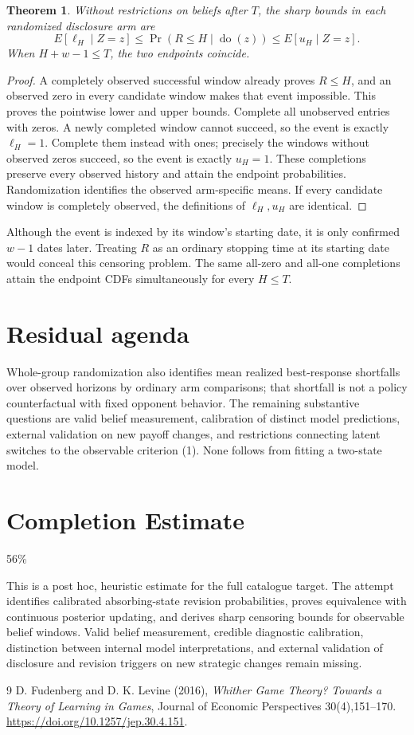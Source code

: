 \documentclass[11pt]{article}
\newtheorem{theorem}{Theorem}
\theoremstyle{definition}
\begin{document}
\begin{theorem}
Without restrictions on beliefs after $T$, the sharp bounds in each
randomized disclosure arm are
\[
 E[\ell_H\mid Z=z]\le
 \Pr(R\le H\mid\operatorname{do}(z))
 \le E[u_H\mid Z=z].                                   \tag{6}
\]
When $H+w-1\le T$, the two endpoints coincide.
\end{theorem}
\begin{proof}
A completely observed successful window already proves $R\le H$,
and an observed zero in every candidate window makes that event
impossible. This proves the pointwise lower and upper bounds. Complete
all unobserved entries with zeros. A newly completed window cannot
succeed, so the event is exactly $\ell_H=1$. Complete them instead
with ones; precisely the windows without observed zeros succeed, so
the event is exactly $u_H=1$. These completions preserve every observed
history and attain the endpoint probabilities. Randomization identifies
the observed arm-specific means. If every candidate window is completely
observed, the definitions of $\ell_H,u_H$ are identical.
\end{proof}
Although the event is indexed by its window's starting date, it is only
confirmed $w-1$ dates later. Treating $R$ as an ordinary stopping time
at its starting date would conceal this censoring problem. The same
all-zero and all-one completions attain the endpoint CDFs simultaneously
for every $H\le T$.

\section*{Residual agenda}
Whole-group randomization also identifies mean realized best-response
shortfalls over observed horizons by ordinary arm comparisons; that
shortfall is not a policy counterfactual with fixed opponent behavior.
The remaining substantive questions are valid belief measurement,
calibration of distinct model predictions, external validation on new
payoff changes, and restrictions connecting latent switches to the
observable criterion (1). None follows from fitting a two-state model.

\section{Completion Estimate}
56\%

This is a post hoc, heuristic estimate for the full catalogue target.
The attempt identifies calibrated absorbing-state revision probabilities, proves equivalence with continuous posterior updating, and derives sharp censoring bounds for observable belief windows. Valid belief measurement, credible diagnostic calibration, distinction between internal model interpretations, and external validation of disclosure and revision triggers on new strategic changes remain missing.

\begin{thebibliography}{9}
 D. Fudenberg and D. K. Levine (2016), \emph{Whither Game
Theory? Towards a Theory of Learning in Games}, Journal of Economic
Perspectives 30(4),151--170.
\url{https://doi.org/10.1257/jep.30.4.151}.
\end{thebibliography}
\end{document}
